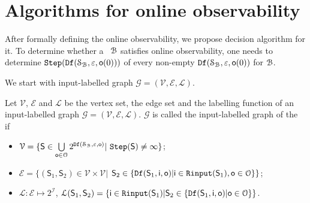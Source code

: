 
\section{Algorithms for online observability}
\label{sec:deter}
After formally defining the online observability, we propose decision algorithm for it. To determine whether a \BCN\ ${\mathcal{B}}$ satisfies online observability, one needs to determine ${\tt Step}({\tt Df}(\mathcal{S}_{\mathcal{B}},\varepsilon,\mathsf{o}(0)))$ of every non-empty ${\tt Df}(\mathcal{S}_{\mathcal{B}},\varepsilon, \mathsf{o}(0))$ for ${\mathcal{B}}$. 

We start with input-labelled graph $\mathcal{G}=(\mathcal{V}, \mathcal{E}, \mathcal{L})$.

\begin{definition}
Let $\mathcal{V}$, $\mathcal{E}$ and $\mathcal{L}$ be the vertex set, the edge set and the labelling function of an input-labelled graph $\mathcal{G}=(\mathcal{V}, \mathcal{E}, \mathcal{L})$. $\mathcal{G}$ is called the input-labelled graph of the \BCN\, if 
\begin{itemize}
\item  $\mathcal{V}=\{\mathsf{S}\in\bigcup\limits_{\mathsf{o}\in\mathcal{O}} 2^{{\tt Df}(\mathcal{S}_{\mathcal{B}},\varepsilon,\mathsf{o} )}|\ {\tt Step}(\mathsf{S})\ne \infty\}$;
\item  $\mathcal{E}=\{(\mathsf{S}_1,\mathsf{S}_2)\in \mathcal{V}\times \mathcal{V}|$ $\mathsf{S}_2\in\{{\tt Df}(\mathsf{S}_1,\mathsf{i},\mathsf{o})|\mathsf{i}\in{\tt Rinput}(\mathsf{S}_1),\mathsf{o}\in  \mathcal{O}\}\}$;
\item  $\mathcal{L}:\mathcal{E}\mapsto 2^{\mathcal{I}}$, $\mathcal{L}(\mathsf{S}_1,\mathsf{S}_2)=\{\mathsf{i}\in {\tt Rinput}(\mathsf{S}_1)|\mathsf{S}_2\in\{{\tt Df}(\mathsf{S}_1,\mathsf{i},\mathsf{o})|\mathsf{o}\in  \mathcal{O}\}\}$.
 \end{itemize}
\end{definition}

